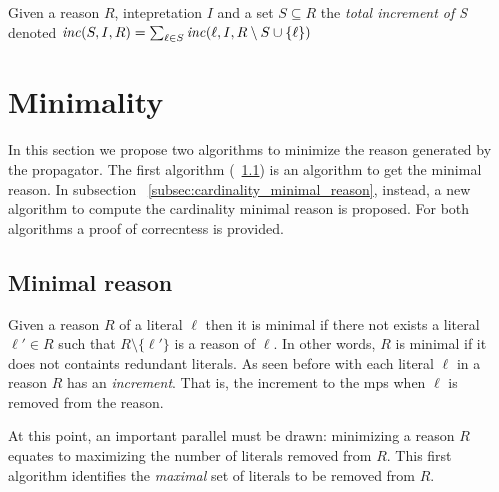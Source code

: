 Given a reason $R$, intepretation $I$ and a set $S \subseteq R$
the \textit{total increment of S} denoted $\mathit{inc}(S,I,R) = \sum_{\ell \in S} \mathit{inc}(\ell, I, R \setminus S \cup \{\ell\})$ 

\section{Minimality}
\label{sec:minimality}
In this section we  propose two algorithms to minimize the reason 
generated by the propagator. The first algorithm  (~\ref{subsec:minimal_reason}) is an algorithm
to get the minimal reason.
In subsection ~\ref{subsec:cardinality_minimal_reason}, instead,
a new algorithm to compute the cardinality minimal reason is proposed.
For both algorithms a proof of correcntess is provided.

\subsection{Minimal reason}
\label{subsec:minimal_reason}

Given a reason $R$ of a literal $\ell$ then it is minimal if there  not exists 
a literal $\ell' \in R$ such that $R \setminus \{\ell'\}$ is a reason of 
$\ell$. In other words, $R$ is minimal if it does not containts redundant literals.
As seen before with each literal $\ell$ in a reason $R$ has an \textit{increment}.
That is, the increment to the mps when  $\ell$ is removed from the reason.

At this point, an important parallel must be drawn: 
minimizing a reason \(R\) equates to maximizing the
number of literals removed from \(R\). 
This first algorithm identifies the \textit{maximal} 
set of literals to be removed from \(R\).

